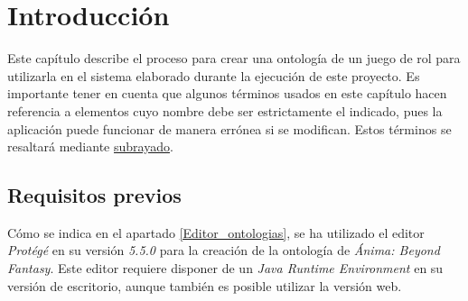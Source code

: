 
\section{Introducción}
Este capítulo describe el proceso para crear una ontología de un juego de rol para utilizarla en el sistema 
elaborado durante la ejecución de este proyecto. Es importante tener en cuenta que algunos términos usados 
en este capítulo hacen referencia a elementos cuyo nombre debe ser estrictamente el indicado, pues la aplicación 
puede funcionar de manera errónea si se modifican. Estos términos se resaltará mediante \underline{subrayado}.

\subsection{Requisitos previos}
Cómo se indica en el apartado \ref*{Editor_ontologias}, se ha utilizado el editor \textit{Protégé} en su versión 
\textit{5.5.0} para la creación de la ontología de \textit{Ánima: Beyond Fantasy}. Este editor requiere disponer 
de un \textit{Java Runtime Environment} en su versión de escritorio, aunque también es posible utilizar la versión 
web.


